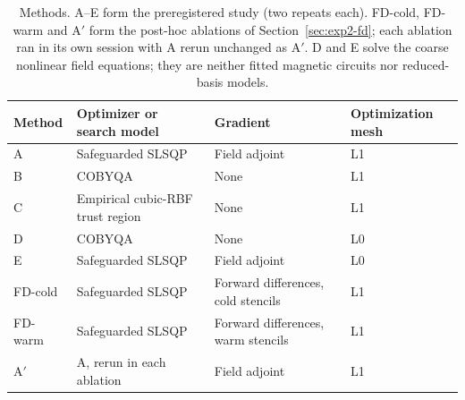 \begin{table}[H]\centering\small
\caption{Methods. A--E form the preregistered study (two repeats each).
FD-cold, FD-warm and A$'$ form the post-hoc ablations of
Section~\ref{sec:exp2-fd}; each ablation ran in its own session with A
rerun unchanged as A$'$. D and E solve the coarse nonlinear field
equations; they are neither fitted magnetic circuits nor reduced-basis
models.}
\label{tab:methods}\setlength{\tabcolsep}{5pt}
\begin{tabular}{llll}\toprule
Method & Optimizer or search model & Gradient & Optimization mesh\\\midrule
A & Safeguarded SLSQP & Field adjoint & L1\\
B & COBYQA & None & L1\\
C & Empirical cubic-RBF trust region & None & L1\\
D & COBYQA & None & L0\\
E & Safeguarded SLSQP & Field adjoint & L0\\\addlinespace
FD-cold & Safeguarded SLSQP & Forward differences, cold stencils & L1\\
FD-warm & Safeguarded SLSQP & Forward differences, warm stencils & L1\\
A$'$ & A, rerun in each ablation & Field adjoint & L1\\\bottomrule
\end{tabular}
\end{table}

